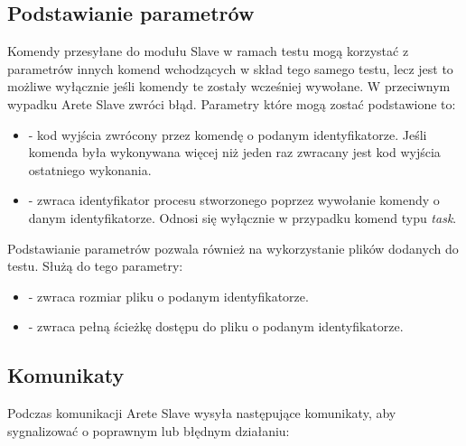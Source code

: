 \documentclass[00-praca-magisterska.tex]{subfiles}
\begin{document}
\subsection{Podstawianie parametrów}
\label{arete-slave-podst-param}

Komendy przesyłane do modułu Slave w ramach testu mogą korzystać z parametrów
innych komend wchodzących w skład tego samego testu, lecz jest to możliwe
wyłącznie jeśli komendy te zostały wcześniej wywołane. W przeciwnym wypadku
Arete Slave zwróci błąd. Parametry które mogą zostać podstawione to:

\begin{itemize}
  \setlength{\itemsep}{10pt}

\item{ - kod wyjścia zwrócony przez komendę
o podanym identyfikatorze. Jeśli komenda była wykonywana więcej niż jeden raz
zwracany jest kod wyjścia ostatniego wykonania.}

\item{ - zwraca identyfikator procesu stworzonego
poprzez wywołanie komendy o danym identyfikatorze. Odnosi się wyłącznie w
przypadku komend typu \emph{task}.}

\end{itemize}

Podstawianie parametrów pozwala również na wykorzystanie plików dodanych do
testu. Służą do tego parametry:

\begin{itemize}
  \setlength{\itemsep}{10pt}

\item{ - zwraca rozmiar pliku o podanym
identyfikatorze.}

\item{ - zwraca pełną ścieżkę dostępu do pliku o
podanym identyfikatorze.}

\end{itemize}

\subsection{Komunikaty}
\label{arete-slave-komunikaty}

Podczas komunikacji Arete Slave wysyła następujące komunikaty, aby
sygnalizować o poprawnym lub błędnym działaniu:
\end{document}
